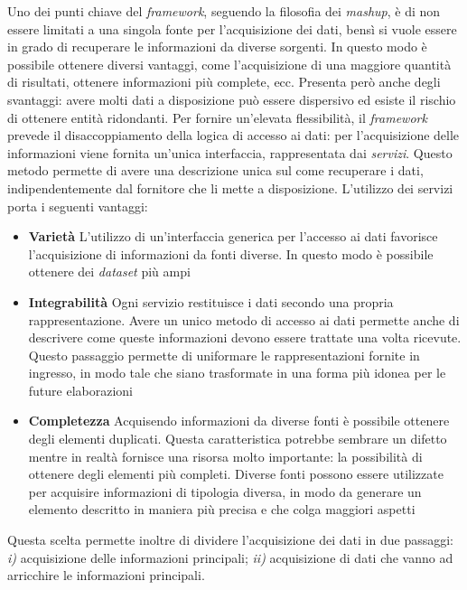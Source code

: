 Uno dei punti chiave del \emph{framework}, seguendo la filosofia dei \emph{mashup}, è di non essere limitati a una singola fonte per l'acquisizione dei dati, bensì si vuole essere in grado di recuperare le informazioni da diverse sorgenti. In questo modo è possibile ottenere diversi vantaggi, come l'acquisizione di una maggiore quantità di risultati, ottenere informazioni più complete, ecc. Presenta però anche degli svantaggi: avere molti dati a disposizione può essere dispersivo ed esiste il rischio di ottenere entità ridondanti. Per fornire un'elevata flessibilità, il \emph{framework} prevede il disaccoppiamento della logica di accesso ai dati: per l'acquisizione delle informazioni viene fornita un'unica interfaccia, rappresentata dai \emph{servizi}. Questo metodo permette di avere una descrizione unica sul come recuperare i dati, indipendentemente dal fornitore che li mette a disposizione. L'utilizzo dei servizi porta i seguenti vantaggi:

\begin{itemize}
	\item \textbf{Varietà}
	L'utilizzo di un'interfaccia generica per l'accesso ai dati favorisce l'acquisizione di informazioni da fonti diverse. In questo modo è possibile ottenere dei \emph{dataset} più ampi
	\item \textbf{Integrabilità}
	Ogni servizio restituisce i dati secondo una propria rappresentazione. Avere un unico metodo di accesso ai dati permette anche di descrivere come queste informazioni devono essere trattate una volta ricevute. Questo passaggio permette di uniformare le rappresentazioni fornite in ingresso, in modo tale che siano trasformate in una forma più idonea per le future elaborazioni
	\item \textbf{Completezza}
	Acquisendo informazioni da diverse fonti è possibile ottenere degli elementi duplicati. Questa caratteristica potrebbe sembrare un difetto mentre in realtà fornisce una risorsa molto importante: la possibilità di ottenere degli elementi più completi. Diverse fonti possono essere utilizzate per acquisire informazioni di tipologia diversa, in modo da generare un elemento descritto in maniera più precisa e che colga maggiori aspetti
\end{itemize}

Questa scelta permette inoltre di dividere l'acquisizione dei dati in due passaggi: \emph{i)} acquisizione delle informazioni principali; \emph{ii)} acquisizione di dati che vanno ad arricchire le informazioni principali. 

